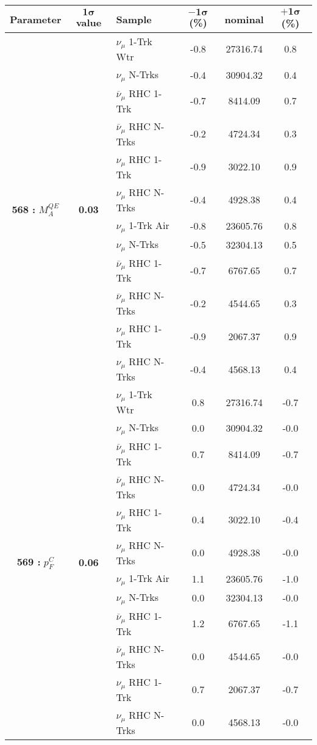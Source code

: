 \addtocounter{table}{-1}
\begin{table}[ht!]
\centering

\begin{tabular}{ c  c  l  c  c  c }
\midrule[1.3pt]
\textbf{Parameter} & \textbf{$\mathbf{1\sigma}$ value} & \textbf{Sample} & \textbf{$\mathbf{-1\sigma}$ (\%)}  &  \textbf{nominal}  &  \textbf{$\mathbf{+1\sigma}$ (\%)} \\
\midrule[1.3pt]
\multirow{12}{*}{\textbf{568 : }$M_A^{QE}$} & \multirow{12}{*}{\textbf{0.03}} & $\nu_\mu$ 1-Trk Wtr &   -0.8 &  27316.74 &   0.8 \\ 
 &  & $\nu_\mu$ N-Trks &   -0.4 &  30904.32 &   0.4 \\ 
 &  & $\overline{\nu}_\mu$ RHC 1-Trk &   -0.7 &  8414.09 &   0.7 \\ 
 &  & $\overline{\nu}_\mu$ RHC N-Trks &   -0.2 &  4724.34 &   0.3 \\ 
 &  & $\nu_\mu$ RHC 1-Trk &   -0.9 &  3022.10 &   0.9 \\ 
 &  & $\nu_\mu$ RHC N-Trks &   -0.4 &  4928.38 &   0.4 \\ 
 &  & $\nu_\mu$ 1-Trk Air &   -0.8 &  23605.76 &   0.8 \\ 
 &  & $\nu_\mu$ N-Trks &   -0.5 &  32304.13 &   0.5 \\ 
 &  & $\overline{\nu}_\mu$ RHC 1-Trk &   -0.7 &  6767.65 &   0.7 \\ 
 &  & $\overline{\nu}_\mu$ RHC N-Trks &   -0.2 &  4544.65 &   0.3 \\ 
 &  & $\nu_\mu$ RHC 1-Trk &   -0.9 &  2067.37 &   0.9 \\ 
 &  & $\nu_\mu$ RHC N-Trks &   -0.4 &  4568.13 &   0.4 \\ 
\midrule[1.3pt]
\multirow{12}{*}{\textbf{569 : }$p_F^C$} & \multirow{12}{*}{\textbf{0.06}} & $\nu_\mu$ 1-Trk Wtr &   0.8 &  27316.74 &   -0.7 \\ 
 &  & $\nu_\mu$ N-Trks &   0.0 &  30904.32 &   -0.0 \\ 
 &  & $\overline{\nu}_\mu$ RHC 1-Trk &   0.7 &  8414.09 &   -0.7 \\ 
 &  & $\overline{\nu}_\mu$ RHC N-Trks &   0.0 &  4724.34 &   -0.0 \\ 
 &  & $\nu_\mu$ RHC 1-Trk &   0.4 &  3022.10 &   -0.4 \\ 
 &  & $\nu_\mu$ RHC N-Trks &   0.0 &  4928.38 &   -0.0 \\ 
 &  & $\nu_\mu$ 1-Trk Air &   1.1 &  23605.76 &   -1.0 \\ 
 &  & $\nu_\mu$ N-Trks &   0.0 &  32304.13 &   -0.0 \\ 
 &  & $\overline{\nu}_\mu$ RHC 1-Trk &   1.2 &  6767.65 &   -1.1 \\ 
 &  & $\overline{\nu}_\mu$ RHC N-Trks &   0.0 &  4544.65 &   -0.0 \\ 
 &  & $\nu_\mu$ RHC 1-Trk &   0.7 &  2067.37 &   -0.7 \\ 
 &  & $\nu_\mu$ RHC N-Trks &   0.0 &  4568.13 &   -0.0 \\ 
\midrule[1.3pt]
\end{tabular}
\end{table}
